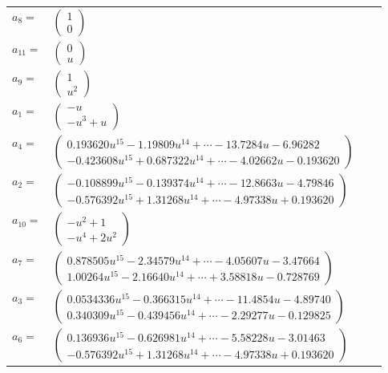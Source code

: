 \documentclass[1p]{elsarticle_modified}
\theoremstyle{definition}
\begin{document}
\begin{tabular}{m{7pt} m{180pt} m{7pt} m{180pt} }
\flushright $a_{8}=$&$\begin{pmatrix}1\\0\end{pmatrix}$ \\
\flushright $a_{11}=$&$\begin{pmatrix}0\\u\end{pmatrix}$ \\
\flushright $a_{9}=$&$\begin{pmatrix}1\\u^2\end{pmatrix}$ \\
\flushright $a_{1}=$&$\begin{pmatrix}- u\\- u^3+u\end{pmatrix}$ \\
\flushright $a_{4}=$&$\begin{pmatrix}0.193620 u^{15}-1.19809 u^{14}+\cdots-13.7284 u-6.96282\\-0.423608 u^{15}+0.687322 u^{14}+\cdots-4.02662 u-0.193620\end{pmatrix}$ \\
\flushright $a_{2}=$&$\begin{pmatrix}-0.108899 u^{15}-0.139374 u^{14}+\cdots-12.8663 u-4.79846\\-0.576392 u^{15}+1.31268 u^{14}+\cdots-4.97338 u+0.193620\end{pmatrix}$ \\
\flushright $a_{10}=$&$\begin{pmatrix}- u^2+1\\- u^4+2 u^2\end{pmatrix}$ \\
\flushright $a_{7}=$&$\begin{pmatrix}0.878505 u^{15}-2.34579 u^{14}+\cdots-4.05607 u-3.47664\\1.00264 u^{15}-2.16640 u^{14}+\cdots+3.58818 u-0.728769\end{pmatrix}$ \\
\flushright $a_{3}=$&$\begin{pmatrix}0.0534336 u^{15}-0.366315 u^{14}+\cdots-11.4854 u-4.89740\\0.340309 u^{15}-0.439456 u^{14}+\cdots-2.29277 u-0.129825\end{pmatrix}$ \\
\flushright $a_{6}=$&$\begin{pmatrix}0.136936 u^{15}-0.626981 u^{14}+\cdots-5.58228 u-3.01463\\-0.576392 u^{15}+1.31268 u^{14}+\cdots-4.97338 u+0.193620\end{pmatrix}$ \\

\end{tabular}
\end{document}
